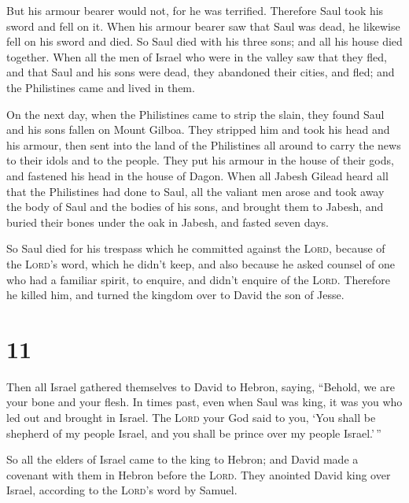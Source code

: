 But his armour bearer would not, for he was terrified. Therefore Saul
took his sword and fell on it.  When his armour bearer saw
that Saul was dead, he likewise fell on his sword and died.
 So Saul died with his three sons; and all his house died
together.  When all the men of Israel who were in the
valley saw that they fled, and that Saul and his sons were dead, they
abandoned their cities, and fled; and the Philistines came and lived in
them.

 On the next day, when the Philistines came to strip the
slain, they found Saul and his sons fallen on Mount Gilboa.
 They stripped him and took his head and his armour, then
sent into the land of the Philistines all around to carry the news to
their idols and to the people.  They put his armour in
the house of their gods, and fastened his head in the house of Dagon.
 When all Jabesh Gilead heard all that the Philistines
had done to Saul,  all the valiant men arose and took
away the body of Saul and the bodies of his sons, and brought them to
Jabesh, and buried their bones under the oak in Jabesh, and fasted seven
days.

 So Saul died for his trespass which he committed against
the \textsc{Lord}, because of the \textsc{Lord}'s word, which he didn't
keep, and also because he asked counsel of one who had a familiar
spirit, to enquire,  and didn't enquire of the
\textsc{Lord}. Therefore he killed him, and turned the kingdom over to
David the son of Jesse.

\hypertarget{section-10}{%
\section{11}\label{section-10}}

 Then all Israel gathered themselves to David to Hebron,
saying, ``Behold, we are your bone and your flesh.  In
times past, even when Saul was king, it was you who led out and brought
in Israel. The \textsc{Lord} your God said to you, `You shall be
shepherd of my people Israel, and you shall be prince over my people
Israel.'\,''

 So all the elders of Israel came to the king to Hebron;
and David made a covenant with them in Hebron before the \textsc{Lord}.
They anointed David king over Israel, according to the \textsc{Lord}'s
word by Samuel.

